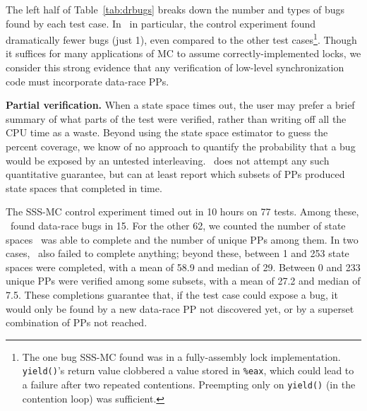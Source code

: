 The left half of Table~\ref{tab:drbugs}
breaks down the number and types of bugs found by each test case.
In \mxtest~in particular, the control experiment found dramatically fewer bugs (just 1),
even compared to the other test cases\footnote{
	The one bug SSS-MC found was in a fully-assembly lock implementation. {\tt yield()}'s return value clobbered a value stored in {\tt \%eax}, which could lead to a failure after two repeated contentions. Preempting only on {\tt yield()} (in the contention loop) was sufficient.}.
Though it suffices for many applications of MC to assume correctly-implemented locks,
we consider this strong evidence that any verification of low-level synchronization code must incorporate data-race PPs.

{\bf Partial verification.}
When a state space times out, the user may prefer a brief summary of what parts of the test were verified, rather than writing off all the CPU time as a waste.
Beyond using the state space estimator to guess the percent coverage,
we know of no approach to quantify the probability
that a bug would be exposed by an untested interleaving.
\quicksand~does not attempt any such quantitative guarantee,
but can at least report which subsets of PPs produced state spaces that completed in time.

The SSS-MC control experiment timed out in 10 hours on 77 tests.
Among these, \quicksand~found data-race bugs in 15.
For the other 62, we counted the number of state spaces \quicksand~was able to complete and the number of unique PPs among them.
In two cases, \quicksand~also failed to complete anything; beyond these,
between 1 and 253 state spaces were completed, with a mean of 58.9 and median of 29.
Between 0 and 233 unique PPs were verified among some subsets, with a mean of 27.2 and median of 7.5.
These completions guarantee that, if the test case could expose a bug,
it would only be found by a new data-race PP not discovered yet, or by a superset combination of PPs not reached.

